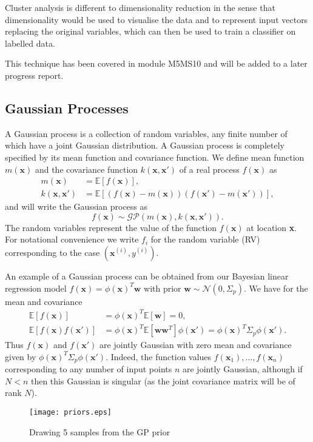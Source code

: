 \documentclass[english]{article}
\begin{document}
Cluster analysis is different to dimensionality reduction in the sense that dimensionality would be used to visualise the data and to represent input vectors replacing the original variables, which can then be used to train a classifier on labelled data.

This technique has been covered in module M5MS10 and will be added to a later progress report.
\subsection{Gaussian Processes}
A Gaussian process is a collection of random variables, any finite number of which have a joint Gaussian distribution.  A Gaussian process is completely specified by its mean function and covariance function. We define mean function $m(\textbf{x})$ and the covariance function $k(\textbf{x},\textbf{x}')$ of a real process $f(\textbf{x})$ as
\begin{align}
	m(\textbf{x}) &= \mathbb{E}[f(\textbf{x})], \\
	k(\textbf{x},\textbf{x}') &= \mathbb{E}[(f(\textbf{x})-m(\textbf{x}))(f(\textbf{x}')-m(\textbf{x}'))],
\end{align}
and will write the Gaussian process as 
\begin{equation}
	f(\textbf{x})\sim \mathcal{GP} (m(\textbf{x}),k(\textbf{x},\textbf{x}')).
\end{equation}
The random variables represent the value of the function $f(\textbf{x})$ at location \textbf{x}. For notational convenience we write $f_i$ for the random variable  (RV) corresponding to the case $(\textbf{x}^{(i)},y^{(i)})$.

 An example of a Gaussian process can be obtained from our Bayesian linear regression model $f(\textbf{x}) = \phi(\textbf{x})^T \textbf{w}$ with prior $\textbf{w} \sim \mathcal{N}(0,\Sigma_p)$. We have for the mean and covariance
 \begin{align}
\mathbb{E}[f(\textbf{x})] &= \phi(\textbf{x})^T\mathbb{E}[\textbf{w}]=0, \\
 \mathbb{E}[f(\textbf{x})f(\textbf{x}')] &=\phi(\textbf{x})^T\mathbb{E}[\textbf{w}\textbf{w}^T]\phi(\textbf{x}') =\phi(\textbf{x})^T\Sigma_p\phi(\textbf{x}').
 \end{align}
 Thus $f(\textbf{x})$ and $f(\textbf{x}')$ are jointly Gaussian with zero mean and covariance given by $\phi(\textbf{x})^T\Sigma_p\phi(\textbf{x}')$. Indeed, the function values $f(\textbf{x}_1), \ldots, f(\textbf{x}_n)$ corresponding to any number of input points $n$ are jointly Gaussian, although if $N < n$ then this Gaussian is singular (as the joint covariance matrix will be of rank $N$).
  \begin{figure}[h]
 	\begin{center}
 		\texttt{[image: priors.eps]}
 		\caption{Drawing 5 samples from the GP prior}
 		\label{fig:GPprior}
 	\end{center}
 \end{figure}
\end{document}
